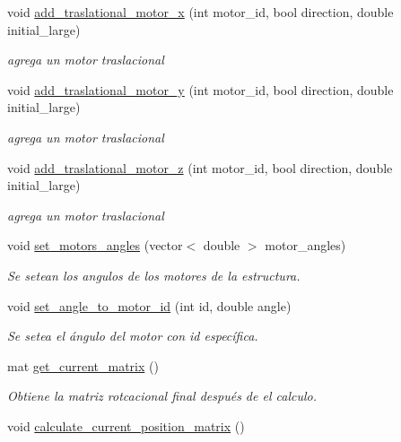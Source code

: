 \begin{DoxyCompactItemize}
void \hyperlink{class_motion__structure_a030fd7bc101347f360181619b0b71e3f}{add\-\_\-traslational\-\_\-motor\-\_\-x} (int motor\-\_\-id, bool direction, double initial\-\_\-large)
\begin{DoxyCompactList}\small\item\em agrega un motor traslacional \end{DoxyCompactList}\item 
void \hyperlink{class_motion__structure_aea04a057f109e87267fc49b46e464c42}{add\-\_\-traslational\-\_\-motor\-\_\-y} (int motor\-\_\-id, bool direction, double initial\-\_\-large)
\begin{DoxyCompactList}\small\item\em agrega un motor traslacional \end{DoxyCompactList}\item 
void \hyperlink{class_motion__structure_a071221988f557f8cf8fdc2c8e2df3398}{add\-\_\-traslational\-\_\-motor\-\_\-z} (int motor\-\_\-id, bool direction, double initial\-\_\-large)
\begin{DoxyCompactList}\small\item\em agrega un motor traslacional \end{DoxyCompactList}\item 
void \hyperlink{class_motion__structure_a2a020cc4ec5e7ddeaa1aa66b42bbf1e9}{set\-\_\-motors\-\_\-angles} (vector$<$ double $>$ motor\-\_\-angles)
\begin{DoxyCompactList}\small\item\em Se setean los angulos de los motores de la estructura. \end{DoxyCompactList}\item 
void \hyperlink{class_motion__structure_a0c73f6580324789218d73a7f72d6a9c9}{set\-\_\-angle\-\_\-to\-\_\-motor\-\_\-id} (int id, double angle)
\begin{DoxyCompactList}\small\item\em Se setea el ángulo del motor con id específica. \end{DoxyCompactList}\item 
mat \hyperlink{class_motion__structure_aaf97ea165dddcc6dc295730704c5102a}{get\-\_\-current\-\_\-matrix} ()
\begin{DoxyCompactList}\small\item\em Obtiene la matriz rotcacional final después de el calculo. \end{DoxyCompactList}\item 
void \hyperlink{class_motion__structure_aaafad930bdd32be66abb80823ab9a85d}{calculate\-\_\-current\-\_\-position\-\_\-matrix} ()

\end{DoxyCompactItemize}
